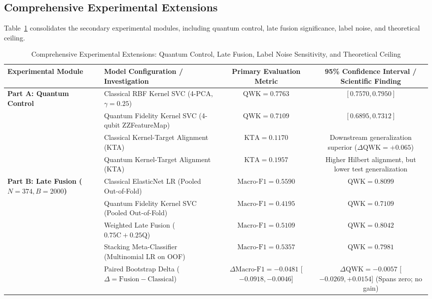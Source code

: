 \documentclass[conference]{IEEEtran}
\begin{document}
\subsection{Comprehensive Experimental Extensions}
Table~\ref{tab:extensions_benchmark} consolidates the secondary experimental modules, including quantum control, late fusion significance, label noise, and theoretical ceiling.

\begin{table}[t]
\centering
\caption{Comprehensive Experimental Extensions: Quantum Control, Late Fusion, Label Noise Sensitivity, and Theoretical Ceiling}
\label{tab:extensions_benchmark}
\renewcommand{\arraystretch}{1.08}
\footnotesize
\begin{tabular*}{\textwidth}{@{\extracolsep{\fill}}llcc@{}}
\toprule
\textbf{Experimental Module} & \textbf{Model Configuration / Investigation} & \textbf{Primary Evaluation Metric} & \textbf{95\% Confidence Interval / Scientific Finding} \\
\midrule
\multirow{4}{*}{\textbf{Part A: Quantum Control}} 
& Classical RBF Kernel SVC (4-PCA, $\gamma = 0.25$) & $\text{QWK} = \mathbf{0.7763}$ & $[0.7570, 0.7950]$ \\
& Quantum Fidelity Kernel SVC (4-qubit ZZFeatureMap) & $\text{QWK} = 0.7109$ & $[0.6895, 0.7312]$ \\
& Classical Kernel-Target Alignment (KTA) & $\text{KTA} = 0.1170$ & Downstream generalization superior ($\Delta\text{QWK} = +0.065$) \\
& Quantum Kernel-Target Alignment (KTA) & $\text{KTA} = \mathbf{0.1957}$ & Higher Hilbert alignment, but lower test generalization \\
\midrule
\multirow{5}{*}{\textbf{Part B: Late Fusion ($N = 374, B = 2000$)}} 
& Classical ElasticNet LR (Pooled Out-of-Fold) & $\text{Macro-F1} = \mathbf{0.5590}$ & $\text{QWK} = \mathbf{0.8099}$ \\
& Quantum Fidelity Kernel SVC (Pooled Out-of-Fold) & $\text{Macro-F1} = 0.4195$ & $\text{QWK} = 0.7109$ \\
& Weighted Late Fusion ($0.75\text{C} + 0.25\text{Q}$) & $\text{Macro-F1} = 0.5109$ & $\text{QWK} = 0.8042$ \\
& Stacking Meta-Classifier (Multinomial LR on OOF) & $\text{Macro-F1} = 0.5357$ & $\text{QWK} = 0.7981$ \\
& Paired Bootstrap Delta ($\Delta = \text{Fusion} - \text{Classical}$) & $\Delta\text{Macro-F1} = -0.0481$ [$-0.0918, -0.0046$] & $\Delta\text{QWK} = -0.0057$ [$-0.0269, +0.0154$] (Spans zero; no gain) \\

\end{tabular*}
\end{table}
\end{document}
